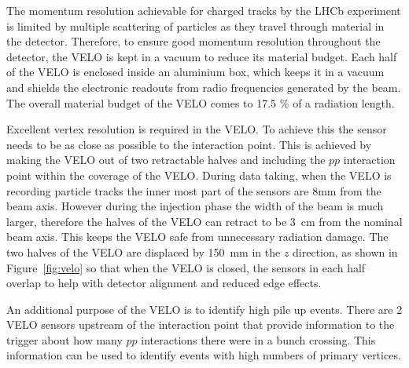 The momentum resolution achievable for charged tracks by the LHCb experiment is limited by multiple scattering of particles as they travel through material in the detector. Therefore, to ensure good momentum resolution throughout the detector, the VELO is kept in a vacuum to reduce its material budget. Each half of the VELO is enclosed inside an aluminium box, which keeps it in a vacuum and shields the electronic readouts from radio frequencies generated by the beam. The overall material budget of the VELO comes to 17.5 $\%$ of a radiation length.

Excellent vertex resolution is required in the VELO. To achieve this the sensor needs to be as close as possible to the interaction point. This is achieved by making the VELO out of two retractable halves and including the $pp$ interaction point within the coverage of the VELO. 
During data taking, when the VELO is recording particle tracks the inner most part of the sensors are 8mm from the beam axis. However during the injection phase the width of the beam is much larger, therefore the halves of the VELO can retract to be 3~cm from the nominal beam axis. This keeps the VELO safe from unnecessary radiation damage. The two halves of the VELO are displaced by 150~mm in the $z$ direction, as shown in Figure~\ref{fig:velo} so that when the VELO is closed, the sensors in each half overlap to help with detector alignment and reduced edge effects. 



An additional purpose of the VELO is to identify high pile up events. There are 2 VELO sensors upstream of the interaction point that provide information to the trigger about how many $pp$ interactions there were in a bunch crossing. This information can be used to identify events with high numbers of primary vertices. %

